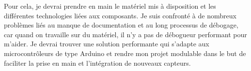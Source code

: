 Pour cela, je devrai prendre en main le matériel mis à disposition et  les différentes technologies liées aux composants.
Je suis confronté à de nombreux problèmes liés au manque de documentation et au long processus de débogage, car quand on travaille sur du matériel, il n’y a pas de débogueur performant pour m'aider.
Je devrai trouver une solution performante qui s'adapte aux microcontrôleurs de type Arduino et rendre mon projet modulable dans le but de faciliter la prise en main et l’intégration de nouveaux capteurs.  


\newpage